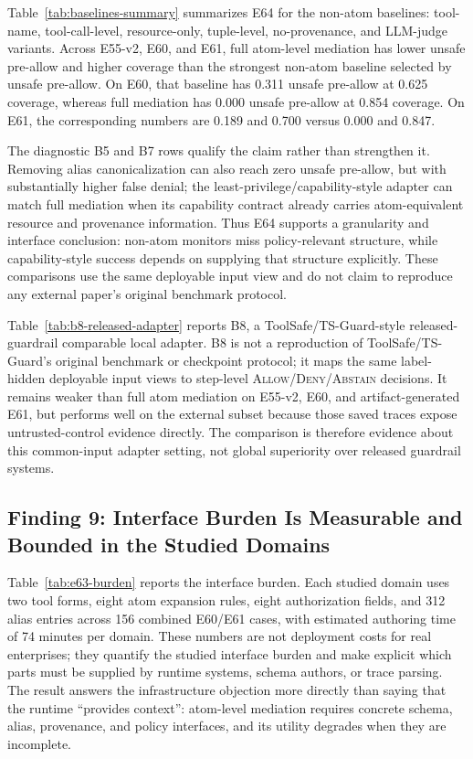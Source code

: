 


Table~\ref{tab:baselines-summary} summarizes E64 for the non-atom baselines: tool-name, tool-call-level, resource-only, tuple-level, no-provenance, and LLM-judge variants. Across E55-v2, E60, and E61, full atom-level mediation has lower unsafe pre-allow and higher coverage than the strongest non-atom baseline selected by unsafe pre-allow. On E60, that baseline has 0.311 unsafe pre-allow at 0.625 coverage, whereas full mediation has 0.000 unsafe pre-allow at 0.854 coverage. On E61, the corresponding numbers are 0.189 and 0.700 versus 0.000 and 0.847.

The diagnostic B5 and B7 rows qualify the claim rather than strengthen it. Removing alias canonicalization can also reach zero unsafe pre-allow, but with substantially higher false denial; the least-privilege/capability-style adapter can match full mediation when its capability contract already carries atom-equivalent resource and provenance information. Thus E64 supports a granularity and interface conclusion: non-atom monitors miss policy-relevant structure, while capability-style success depends on supplying that structure explicitly. These comparisons use the same deployable input view and do not claim to reproduce any external paper's original benchmark protocol.

Table~\ref{tab:b8-released-adapter} reports B8, a ToolSafe/TS-Guard-style released-guardrail comparable local adapter. B8 is not a reproduction of ToolSafe/TS-Guard's original benchmark or checkpoint protocol; it maps the same label-hidden deployable input views to step-level \textsc{Allow}/\textsc{Deny}/\textsc{Abstain} decisions. It remains weaker than full atom mediation on E55-v2, E60, and artifact-generated E61, but performs well on the external subset because those saved traces expose untrusted-control evidence directly. The comparison is therefore evidence about this common-input adapter setting, not global superiority over released guardrail systems.

\subsection{Finding 9: Interface Burden Is Measurable and Bounded in the Studied Domains}



Table~\ref{tab:e63-burden} reports the interface burden. Each studied domain uses two tool forms, eight atom expansion rules, eight authorization fields, and 312 alias entries across 156 combined E60/E61 cases, with estimated authoring time of 74 minutes per domain. These numbers are not deployment costs for real enterprises; they quantify the studied interface burden and make explicit which parts must be supplied by runtime systems, schema authors, or trace parsing. The result answers the infrastructure objection more directly than saying that the runtime ``provides context'': atom-level mediation requires concrete schema, alias, provenance, and policy interfaces, and its utility degrades when they are incomplete.

